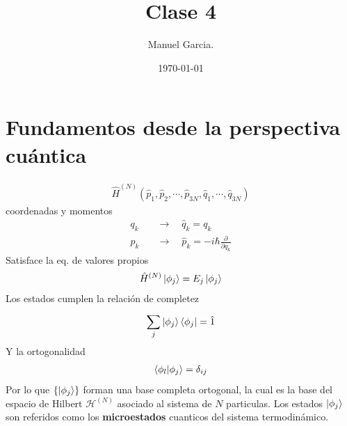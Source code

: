 \documentclass{article}
\title{Clase 4 }
\author{Manuel Garcia.}
\date{\today}
\begin{document}
\maketitle

\section{Fundamentos desde la perspectiva cuántica }
\begin{gather*}
  \hat H ^ {(N )} (\hat p_1, \hat p_2, \cdots, \hat p _{3N } , \hat q_1, \cdots, \hat q _{3N } )
\end{gather*}
coordenadas y momentos
\begin{align*}
  q_k &\quad \rightarrow \quad \hat q_k = q_k \\
  p_k &\quad \rightarrow \quad \hat p_k = - i \hbar  \frac{\partial  }{\partial q_k }
\end{align*}
Satisface la eq. de valores propios 
\begin{gather*}
 \hat H ^ {(N) }\ket{\phi_j } = E_j \ket{\phi_j } 
\end{gather*}
Los estados cumplen la relación de completez 
\begin{gather*}
  \displaystyle\sum_{j }^{} \ket{\phi_j } \bra{\phi_j } = \hat 1  
\end{gather*}
Y la ortogonalidad 
\begin{gather*}
  \bra{\phi_l }\ket{\phi_j } = \delta _{ij }   
\end{gather*}
Por lo que $ \{\ket{\phi_j }\} $ forman una base completa ortogonal, la cual es la base del espacio de Hilbert $ \mathcal{H} ^ {(N) } $ asociado al sistema de $ N  $ particulas. Los estados $ \ket{\phi_j } $ son referidos como los \textbf{microestados }cuanticos del sistema termodinámico.
\end{document}

